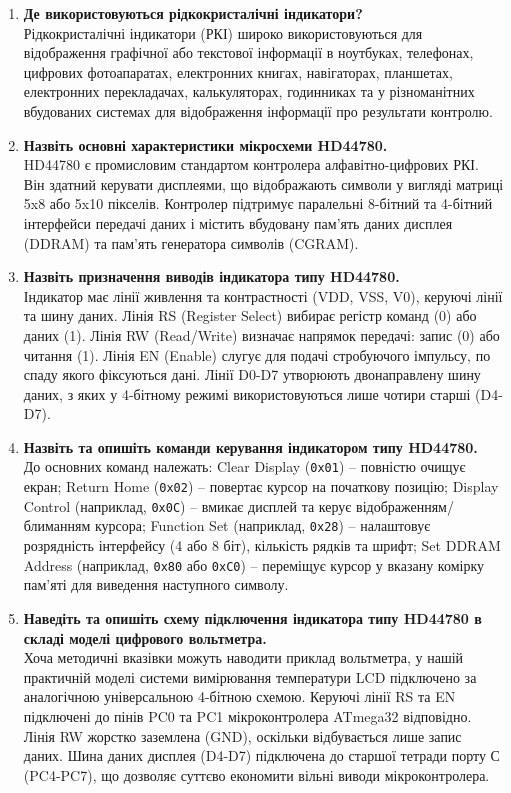 \documentclass[14pt, a4paper]{extreport}
\begin{document}
	\begin{enumerate}
		\item \textbf{Де використовуються рідкокристалічні індикатори?} \\ Рідкокристалічні індикатори (РКІ) широко використовуються для відображення графічної або текстової інформації в ноутбуках, телефонах, цифрових фотоапаратах, електронних книгах, навігаторах, планшетах, електронних перекладачах, калькуляторах, годинниках та у різноманітних вбудованих системах для відображення інформації про результати контролю.
		
		\item \textbf{Назвіть основні характеристики мікросхеми HD44780.} \\ HD44780 є промисловим стандартом контролера алфавітно-цифрових РКІ. Він здатний керувати дисплеями, що відображають символи у вигляді матриці 5x8 або 5x10 пікселів. Контролер підтримує паралельні 8-бітний та 4-бітний інтерфейси передачі даних і містить вбудовану пам'ять даних дисплея (DDRAM) та пам'ять генератора символів (CGRAM).
		
		\item \textbf{Назвіть призначення виводів індикатора типу HD44780.} \\ Індикатор має лінії живлення та контрастності (VDD, VSS, V0), керуючі лінії та шину даних. Лінія RS (Register Select) вибирає регістр команд (0) або даних (1). Лінія RW (Read/Write) визначає напрямок передачі: запис (0) або читання (1). Лінія EN (Enable) слугує для подачі стробуючого імпульсу, по спаду якого фіксуються дані. Лінії D0-D7 утворюють двонаправлену шину даних, з яких у 4-бітному режимі використовуються лише чотири старші (D4-D7).
		
		\item \textbf{Назвіть та опишіть команди керування індикатором типу HD44780.} \\ До основних команд належать: Clear Display (\texttt{0x01}) -- повністю очищує екран; Return Home (\texttt{0x02}) -- повертає курсор на початкову позицію; Display Control (наприклад, \texttt{0x0C}) -- вмикає дисплей та керує відображенням/блиманням курсора; Function Set (наприклад, \texttt{0x28}) -- налаштовує розрядність інтерфейсу (4 або 8 біт), кількість рядків та шрифт; Set DDRAM Address (наприклад, \texttt{0x80} або \texttt{0xC0}) -- переміщує курсор у вказану комірку пам'яті для виведення наступного символу.
		
		\item \textbf{Наведіть та опишіть схему підключення індикатора типу HD44780 в складі моделі цифрового вольтметра.} \\ Хоча методичні вказівки можуть наводити приклад вольтметра, у нашій практичній моделі системи вимірювання температури LCD підключено за аналогічною універсальною 4-бітною схемою. Керуючі лінії RS та EN підключені до пінів PC0 та PC1 мікроконтролера ATmega32 відповідно. Лінія RW жорстко заземлена (GND), оскільки відбувається лише запис даних. Шина даних дисплея (D4-D7) підключена до старшої тетради порту С (PC4-PC7), що дозволяє суттєво економити вільні виводи мікроконтролера.
		

\end{enumerate}
\end{document}

